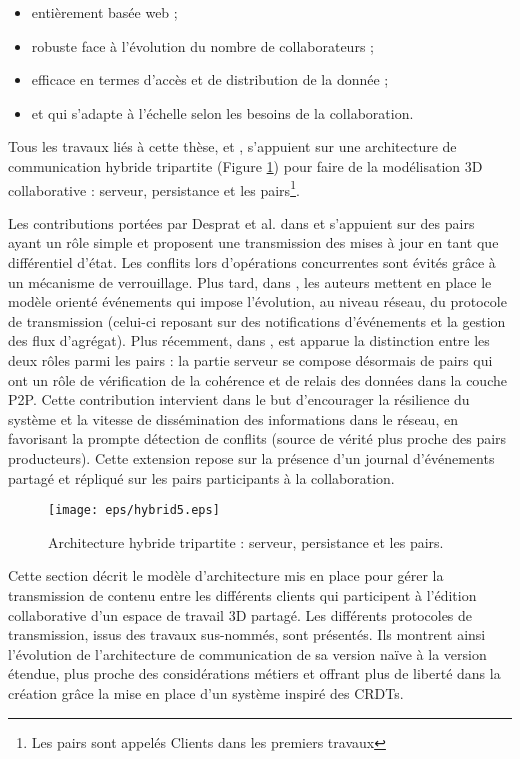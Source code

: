 \begin{itemize}
	\item entièrement basée web ; 
	\item robuste face à l'évolution du nombre de collaborateurs ; 
	\item efficace en termes d'accès et de distribution de la donnée ; 
	\item et qui s'adapte à l'échelle selon les besoins de la collaboration.
\end{itemize}


Tous les travaux liés à cette thèse, 
\cite{Desprat2015a,Desprat2015b,Desprat2016} et \cite{Desprat2017}, s'appuient sur une 
architecture de communication hybride tripartite (Figure \ref{fig:hybrid}) pour 
faire de la modélisation \gls{3D} collaborative : serveur, persistance 
et les pairs\footnote{Les pairs sont appelés \og Clients\fg{} dans les premiers 
travaux}. 

Les contributions portées par Desprat et al. dans \cite{Desprat2015a} et \cite{Desprat2015b} 
s'appuient sur des pairs ayant un rôle simple et proposent une transmission des 
mises à jour en tant que différentiel d'état. Les conflits lors d'opérations 
concurrentes sont évités grâce à un mécanisme de verrouillage. 
Plus tard, dans \cite{Desprat2016}, les auteurs mettent en place le modèle 
orienté événements qui impose l'évolution, au niveau réseau, du protocole 
de transmission (celui-ci reposant sur 
des notifications d'événements et la gestion des flux d'agrégat). 
Plus récemment, dans \cite{Desprat2017}, est apparue la distinction entre 
les deux rôles parmi les pairs : la 
partie serveur se compose désormais de pairs qui ont un rôle de vérification 
de la cohérence et de relais des données dans la couche \gls{P2P}. Cette 
contribution intervient dans le but d'encourager la résilience du système et la 
vitesse de dissémination des informations dans le réseau, en favorisant la prompte 
détection de conflits (source de vérité plus proche des pairs producteurs). 
Cette extension repose sur la présence d'un journal d'événements partagé et 
répliqué sur les pairs participants à la collaboration.

\begin{figure}[h!]
	\centering
	\texttt{[image: eps/hybrid5.eps]}
	\caption{Architecture hybride tripartite : serveur, persistance 
		et les pairs.}
	\label{fig:hybrid}
\end{figure}

Cette section décrit le modèle d'architecture mis en 
place pour gérer la transmission de contenu entre les différents clients 
qui participent à l'édition collaborative d'un espace de travail \gls{3D} partagé. 
Les différents protocoles de transmission, issus des travaux sus-nommés, 
sont présentés. Ils montrent ainsi l'évolution de l'architecture de communication de 
sa version naïve à la version étendue, plus proche des considérations métiers et 
offrant plus de liberté dans la création grâce la mise en place d'un système inspiré 
des \glspl{CRDT}.
 
